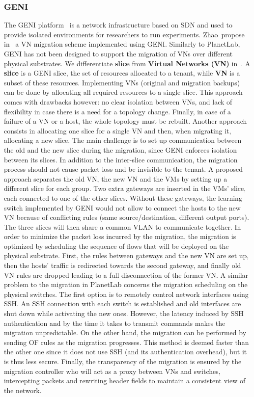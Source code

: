 \subsubsection{GENI}
The GENI platform~\cite{GENI-Berman2014} is a network infrastructure based on SDN and used to provide isolated environments for researchers to run experiments.
Zhao~\etal propose in~\cite{Zhao2017} a VN migration scheme implemented using GENI. 
Similarly to PlanetLab, GENI has not been designed to support the migration of VNs over different physical substrates. 
We differentiate \textbf{slice} from \textbf{Virtual Networks (VN)} in~\cite{Zhao2017}.
A \textbf{slice} is a GENI slice, \ie the set of resources allocated to a tenant, while \textbf{VN} is a subset of these resources.
Implementing VNs (original and migration backups) can be done by allocating all required resources to a single slice. This approach comes with drawbacks however: no clear isolation between VNs, and lack of flexibility in case there is a need for a topology change. Finally, in case of a failure of a VN or a host, the whole topology must be rebuilt.
Another approach consists in allocating one slice for a single VN and then, when migrating it, allocating a new slice. The main challenge is to set up communication between the old and the new slice during the migration, since GENI enforces isolation between its slices.
In addition to the inter-slice communication, the migration process should not cause packet loss and be invisible to the tenant.
A proposed approach separates the old VN, the new VN and the VMs by setting up a different slice for each group. Two extra gateways are inserted in the VMs' slice, each connected to one of the other slices.
Without these gateways, the learning switch implemented by GENI would not allow to connect the hosts to the new VN because of conflicting rules (same source/destination, different output ports).
The three slices will then share a common VLAN to communicate together.
In order to minimize the packet loss incurred by the migration, the migration is optimized by scheduling the sequence of flows that will be deployed on the physical substrate.
First, the rules between gateways and the new VN are set up, then the hosts' traffic is redirected towards the second gateway, and finally old VN rules are dropped leading to a full disconnection of the former VN.
A similar problem to the migration in PlanetLab concerns the migration scheduling on the physical switches.
The first option is to remotely control network interfaces using SSH.
An SSH connection with each switch is established and old interfaces are shut down while activating the new ones.
However, the latency induced by SSH authentication and by the time it takes to transmit commands makes the migration unpredictable.
On the other hand, the migration can be performed by sending OF rules as the migration progresses. This method is deemed faster than the other one since it does not use SSH (and its authentication overhead), but it is thus less secure.
Finally, the transparency of the migration is ensured by the migration controller who will act as a proxy between VNs and switches, intercepting packets and rewriting header fields to maintain a consistent view of the network.

